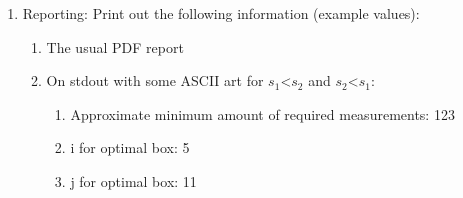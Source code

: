 \documentclass[12pt]{article}
\begin{document}
\begin{enumerate}
\item Reporting: Print out the following information (example values):
  \begin{enumerate}
    \item The usual PDF report
    \item On stdout with some ASCII art for $s_1$\textless $s_2$ and $s_2$\textless $s_1$: 
    \begin{enumerate}
    	\item Approximate minimum amount of required measurements: 123
    	\item i for optimal box: 5
    	\item j for optimal box: 11
    \end{enumerate}
  \end{enumerate}
\end{enumerate}


% 
% 
\end{document}
